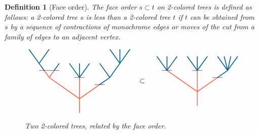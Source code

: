 \documentclass[10pt]{amsart}
\newtheorem{definition}{Definition}[section]
\theoremstyle{remark}
\begin{document}
\begin{definition}[Face order]\leavevmode
The \emph{face order} $s\subset t$ on 2-colored trees is defined as follows: a 2-colored tree $s$ is less than a 2-colored tree $t$ if $t$ can be obtained from $s$ by a sequence of contractions of monochrome edges or moves of the cut from a family of edges to an adjacent vertex.

\begin{figure}[h]
\[\vcenter{\hbox{
\begin{tikzpicture}[yscale=0.7,xscale=1]
\draw[very thick, MidnightBlue] (-2.5,3.5)--(-2,2.5);
\draw[very thick, MidnightBlue] (-1.5,3.5)--(-2,2.5);
\draw[very thick, MidnightBlue] (-2,2.5) -- (-1.75,2);
\draw[very thick, MidnightBlue] (-1.25, 2) -- (-1,2.5);
\draw[very thick, MidnightBlue] (-0.5,2.5) -- (0,1.5);
\draw[very thick, MidnightBlue] (0,1.5)--(0,2.5);
\draw[very thick, MidnightBlue] (0,1.5)--(0.5,2.5);
\draw[very thick, MidnightBlue] (1,1)--(1.5,1.5);
\draw[very thick, MidnightBlue] (1.5,1.5)--(1,2.5);
\draw[very thick, MidnightBlue] (1.5,1.5)--(2,2.5);
\draw[very thick, MidnightBlue] (2,2.5)--(1.5,3.5);
\draw[very thick, MidnightBlue] (2,2.5)--(2,3.5);
\draw[very thick, MidnightBlue] (2,2.5)--(2.5,3.5);
\draw[very thick, Red!60] (0,-1)--(0, 1.5); 
\draw[very thick, Red!60] (0,0)--(-1.5,1.5);
\draw[very thick, Red!60] (-1.5,1.5)--(-1.75, 2); 
\draw[very thick, Red!60] (-1.5,1.5)--(-1.25, 2); 
\draw[very thick, Red!60] (0,0)--(1, 1);
\draw (-2,2) to (-1,2); 
\draw (-0.25,1.5)-- (0.25, 1.5) ; 
\draw (0.75,1) to (1.25,1);
\end{tikzpicture}}}
\quad \subset \quad
\vcenter{\hbox{
\begin{tikzpicture}[yscale=0.7,xscale=1]
\draw[very thick, MidnightBlue] (-1.5,1.5)--(-1.5,2.5);
\draw[very thick, MidnightBlue] (-2,2.5) -- (-1.75,2);
\draw[very thick, MidnightBlue] (-1.25, 2) -- (-1,2.5);
\draw[very thick, MidnightBlue] (-0.5,2.5) -- (0,1.5);
\draw[very thick, MidnightBlue] (0,1.5)--(0,2.5);
\draw[very thick, MidnightBlue] (0,1.5)--(0.5,2.5);
\draw[very thick, MidnightBlue] (1,1)--(1.5,1.5);
\draw[very thick, MidnightBlue] (1.5,1.5)--(1,2.5);
\draw[very thick, MidnightBlue] (1.5,1.5)--(1.33,2.5);
\draw[very thick, MidnightBlue] (1.5,1.5)--(1.66,2.5);
\draw[very thick, MidnightBlue] (1.5,1.5)--(2,2.5);
\draw[very thick, MidnightBlue] (-1.5,1.5)--(-1.75, 2); 
\draw[very thick, MidnightBlue] (-1.5,1.5)--(-1.25, 2); 
\draw[very thick, Red!60] (0,-1)--(0, 1.5); 
\draw[very thick, Red!60] (0,0)--(-1.5,1.5);
\draw[very thick, Red!60] (0,0)--(1, 1);
\draw (-1.75,1.5) to (-1.25,1.5); 
\draw (-0.25,1.5) to (0.25,1.5); 
\draw (0.75,1) to (1.25,1);
\end{tikzpicture}}}
\]
\caption{Two 2-colored trees, related by the face order.}
\label{Fig2:InclusionOrder}
\end{figure}

\end{definition}
\end{document}
